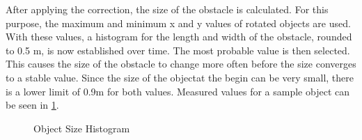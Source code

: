 \documentclass[11pt,oneside,openright]{mpreport}
\begin{document}

After applying the correction, the size of the obstacle is calculated. For this purpose, the maximum and minimum x and y values of
rotated objects are used. With these values, a histogram for the length and width of the obstacle, rounded to 0.5 m, is now established over time. 
The most probable value is then selected. This causes the size of the obstacle to change more often before the size converges to a stable value.
Since the size of the objectat the begin can be very small, there is a lower limit of 0.9m for both values. Measured values for a sample object can be seen in \cref{obst_hist}.
\begin{figure}[!ht]
\begin{center}
\caption{Object Size Histogram}
\label{obst_hist}
\end{center}
\end{figure}
\end{document}
